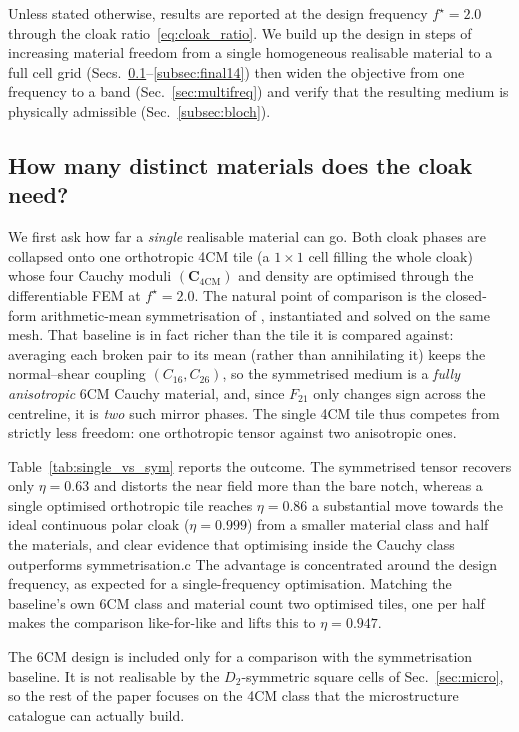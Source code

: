 \documentclass[preprint,12pt]{elsarticle}
\newcommand{\mbf}[1]{\mathbf{#1}}
\begin{document}
Unless stated otherwise, results are reported at the design frequency
$f^\star=2.0$ through the cloak ratio~\eqref{eq:cloak_ratio}. We build up
the design in steps of increasing material freedom from a single
homogeneous realisable material to a full cell grid
(Secs.~\ref{subsec:four_materials}--\ref{subsec:final14}) then widen the
objective from one frequency to a band (Sec.~\ref{sec:multifreq}) and verify
that the resulting medium is physically admissible
(Sec.~\ref{subsec:bloch}).

\subsection{How many distinct materials does the cloak need?}\label{subsec:four_materials}

We first ask how far a \emph{single} realisable material can go. Both cloak
phases are collapsed onto one orthotropic 4CM tile (a $1\times1$ cell filling
the whole cloak) whose four Cauchy moduli $(\mbf{C}_{\mathrm{4CM}})$ and
density are optimised through the differentiable FEM at $f^\star=2.0$. The
natural point of comparison is the closed-form arithmetic-mean symmetrisation
of \citet{chatzopoulos2023}, instantiated and solved on the same mesh. That
baseline is in fact richer than the tile it is compared against: averaging each
broken pair to its mean (rather than annihilating it) keeps the normal--shear
coupling $(C_{16},C_{26})$, so the symmetrised medium is a \emph{fully
anisotropic} 6CM Cauchy material, and, since $F_{21}$ only changes sign across
the centreline, it is \emph{two} such mirror phases. The single 4CM tile thus
competes from strictly less freedom: one orthotropic tensor against two
anisotropic ones.

Table~\ref{tab:single_vs_sym} reports the outcome. The symmetrised tensor
recovers only $\eta=0.63$ and distorts the near field more than the bare notch,
whereas a single optimised orthotropic tile reaches $\eta=0.86$ a
substantial move towards the ideal continuous polar cloak ($\eta=0.999$) from a
smaller material class and half the materials, and clear evidence that
optimising inside the Cauchy class outperforms symmetrisation.c
The advantage is concentrated around the design frequency, as expected for a
single-frequency optimisation. Matching the baseline's own 6CM class and
material count two optimised tiles, one per half makes the comparison like-for-like and lifts
this to $\eta=0.947$.

The 6CM design is included only for a comparison with the
symmetrisation baseline. It is not realisable by the $D_2$-symmetric square
cells of Sec.~\ref{sec:micro}, so the rest of the paper focuses on the 4CM
class that the microstructure catalogue can actually build.
\end{document}
